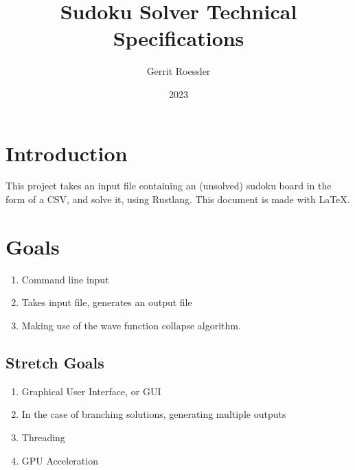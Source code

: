 \documentclass[11pt]{article}
\author{Gerrit Roessler}
\title{Sudoku Solver Technical Specifications}
\date{2023}
\begin{document}
\maketitle
\section{Introduction}
This project takes an input file containing an 
(unsolved) sudoku board in the form of a CSV, and solve it, using Rustlang. This document is made with \LaTeX.
\section{Goals}
\begin{enumerate}
  \item Command line input
  \item Takes input file, generates an output file
  \item Making use of the wave function collapse algorithm.
\end{enumerate}
\subsection{Stretch Goals}
\begin{enumerate}
  \item Graphical User Interface, or GUI
  \item In the case of branching solutions, generating multiple outputs
  \item Threading
  \item GPU Acceleration
\end{enumerate}
\end{document}
